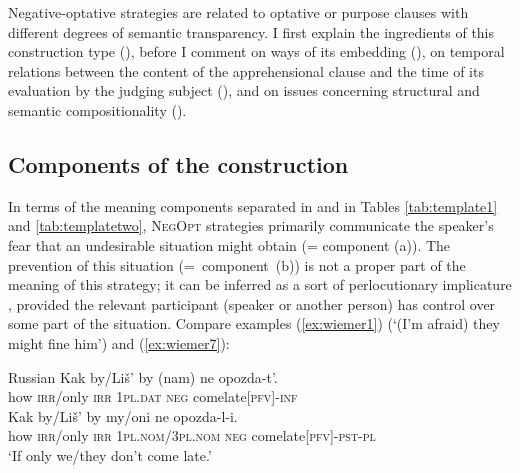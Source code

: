 \documentclass[output=paper,colorlinks,citecolor=brown]{langscibook}
\begin{document}
Negative-optative strategies are related to optative or purpose clauses with different degrees of semantic transparency. I first explain the ingredients of this construction type (), before I comment on ways of its embedding (), on temporal relations between the content of the apprehensional clause and the time of its evaluation by the judging subject (), and on issues concerning structural and semantic compositionality ().



\subsection{Components of the construction}
\label{subsec:negoptcomponents}

In terms of the meaning components separated in  and in Tables \ref{tab:template1} and \ref{tab:templatetwo}, \textsc{NegOpt} strategies primarily communicate the speaker's fear that an undesirable situation might obtain (= component (a)). The prevention of this situation \mbox{(= component (b))} is not a proper part of the meaning of this strategy; it can be inferred as a sort of perlocutionary implicature \citep[29]{Dobrushina2006wiemer}, provided the relevant participant (speaker or another person) has control over some part of the situation. Compare examples (\ref{ex:wiemer1}) (`(I'm afraid) they might fine him') and (\ref{ex:wiemer7}):


\ea \textnormal{Russian}
\label{ex:wiemer7} 
\ea\label{ex:wiemer7a}
\gll Kak by\textnormal{/}Liš' by (nam) ne opozda-t'. \\
how \textsc{irr}/only \textsc{irr} \textsc{1pl.dat} \textsc{neg} come\textunderscore late\textsc{[pfv]-inf} \\
\ex\label{ex:wiemer7b}
\gll Kak by\textnormal{/}Liš' by my\textnormal{/}oni ne opozda-l-i. \\
how \textsc{irr}/only \textsc{irr} \textsc{1pl.nom}/\textsc{3pl.nom} \textsc{neg} come\textunderscore late\textsc{[pfv]-pst-pl} \\
\glt `If only we/they don't come late.'
\z
\z
\end{document}
